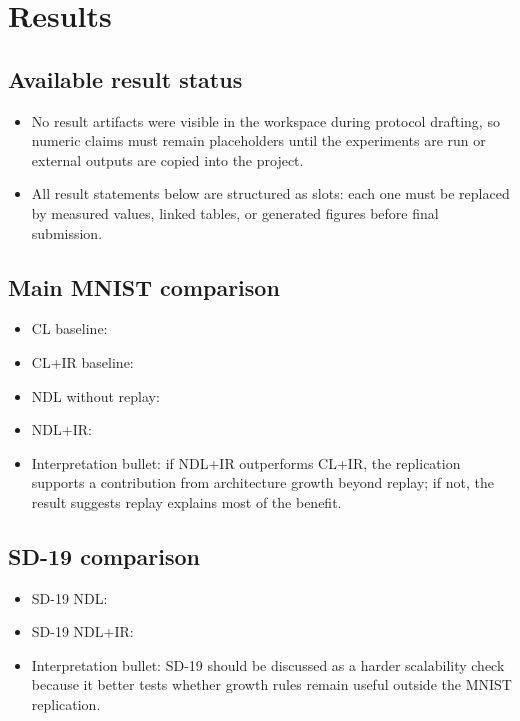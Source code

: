 \section{Results}

\subsection{Available result status}
\begin{itemize}
  \item No result artifacts were visible in the workspace during protocol drafting, so numeric claims must remain placeholders until the experiments are run or external outputs are copied into the project.
  \item All result statements below are structured as slots: each one must be replaced by measured values, linked tables, or generated figures before final submission.
\end{itemize}

\subsection{Main MNIST comparison}
\begin{itemize}
  \item CL baseline: 
  \item CL+IR baseline: 
  \item NDL without replay: 
  \item NDL+IR: 
  \item Interpretation bullet: if NDL+IR outperforms CL+IR, the replication supports a contribution from architecture growth beyond replay; if not, the result suggests replay explains most of the benefit.
\end{itemize}

\subsection{SD-19 comparison}
\begin{itemize}
  \item SD-19 NDL: 
  \item SD-19 NDL+IR: 
  \item Interpretation bullet: SD-19 should be discussed as a harder scalability check because it better tests whether growth rules remain useful outside the MNIST replication.
\end{itemize}

